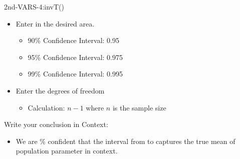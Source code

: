 \documentclass[../stats.tex]{subfiles}
\begin{document}
\begin{itemize}
\begin{itemize}
        2nd-VARS-4:invT()
        \begin{itemize}
            \item Enter in the desired area.
            \begin{itemize}
                \item 90\% Confidence Interval: 0.95 
                \item 95\% Confidence Interval: 0.975
                \item 99\% Confidence Interval: 0.995
            \end{itemize}
            \item Enter the degrees of freedom 
            \begin{itemize}
                \item Calculation: $n-1$ where $n$ is the sample size 
            \end{itemize}
        \end{itemize}
    \end{itemize}
\end{itemize}
Write your conclusion in Context:
\begin{itemize}
    \item We are \blank\% confident that the interval from \blank to \blank captures the true mean of {population parameter in context}.
\end{itemize}
\medbreak
\end{document}
